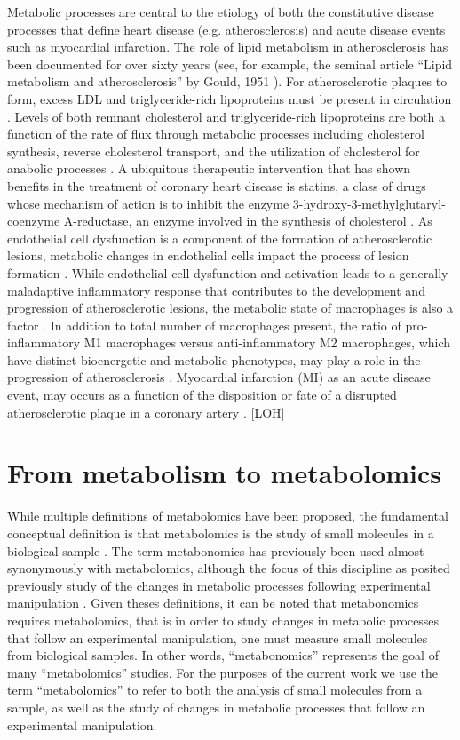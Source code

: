 \begin{DoubleSpace*}
Metabolic processes are central to the etiology of both the constitutive disease processes that define heart disease (e.g. atherosclerosis) and acute disease events such as myocardial infarction. The role of lipid metabolism in atherosclerosis has been documented for over sixty years (see, for example, the seminal article ``Lipid metabolism and atherosclerosis'' by Gould, 1951 \cite{gould1951}). For atherosclerotic plaques to form, excess LDL and triglyceride-rich lipoproteins must be present in circulation \cite{nordestgaard2016}. Levels of both remnant cholesterol and triglyceride-rich lipoproteins are both a function of the rate of flux through metabolic processes including cholesterol synthesis, reverse cholesterol transport, and the utilization of cholesterol for anabolic processes \cite{baynes2014}. A ubiquitous therapeutic intervention that has shown benefits in the treatment of coronary heart disease is statins, a class of drugs whose mechanism of action is to inhibit the enzyme 3-hydroxy-3-methylglutaryl-coenzyme A-reductase, an enzyme involved in the synthesis of cholesterol \cite{chait2016}. As endothelial cell dysfunction is a component of the formation of atherosclerotic lesions, metabolic changes in endothelial cells impact the process of lesion formation \cite{gimbrone2016}. While endothelial cell dysfunction and activation leads to a generally maladaptive inflammatory response that contributes to the development and progression of atherosclerotic lesions, the metabolic state of macrophages is also a factor \cite{bories2017}. In addition to total number of macrophages present, the ratio of pro-inflammatory M1 macrophages versus anti-inflammatory M2 macrophages, which have distinct bioenergetic and metabolic phenotypes, may play a role in the progression of atherosclerosis \cite{bories2017}. Myocardial infarction (MI) as an acute disease event, may occurs as a function of the disposition or fate of a disrupted atherosclerotic plaque in a coronary artery \cite{arbab2015}. [LOH]

\section{From metabolism to metabolomics}
While multiple definitions of metabolomics have been proposed, the fundamental conceptual definition is that metabolomics is the study of small molecules in a biological sample \cite{nicholson2008,johnson2016,newgard2017}. The term metabonomics has previously been used almost synonymously with metabolomics, although the focus of this discipline as posited previously study of the changes in metabolic processes following experimental manipulation \cite{nicholson2008}. Given theses definitions, it can be noted that metabonomics requires metabolomics, that is in order to study changes in metabolic processes that follow an experimental manipulation, one must measure small molecules from biological samples. In other words, ``metabonomics'' represents the goal of many ``metabolomics'' studies. For the purposes of the current work we use the term ``metabolomics'' to refer to both the analysis of small molecules from a sample, as well as the study of changes in metabolic processes that follow an experimental manipulation.


\end{DoubleSpace*}
